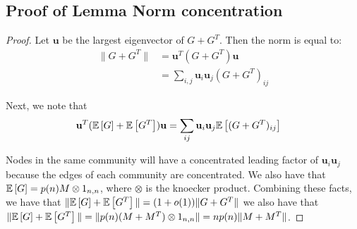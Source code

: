 \subsection{Proof of Lemma Norm concentration}
\begin{proof}\label{lem:norm_eq}
    Let $\mathbf{u}$ be the largest eigenvector of $G+G^T$. Then the norm is equal to:
    \begin{align*}
        \| G +G^T \| &= \mathbf{u}^T (G+G^T) \mathbf{u} \\
        &= \sum_{i,j} \mathbf{u}_i \mathbf{u}_j (G+G^T)_{ij}
    \end{align*}

  Next, we note that
  \begin{align*}
      \mathbf{u}^T (\mathbb{E}\left[G\right] + \mathbb{E}\left[G^T\right]) \mathbf{u} &= \sum_{ij}\mathbf{u}_i \mathbf{u}_j \mathbb{E}\left[(G+G^T)_{ij}  \right] 
  \end{align*}

 Nodes in the same community will have a concentrated leading factor of $\mathbf{u}_i \mathbf{u}_j$ because the edges of each community are concentrated. We also have that $\mathbb{E}\left[G\right] = p(n) M \otimes 1_{n,n}$, where $\otimes$ is the knoecker product.  Combining these facts, we have that  $\|\mathbb{E}\left[G\right]  + \mathbb{E}\left[G^T\right]\| = (1 + o(1)) \| G+G^T \| $ we also have that $\|\mathbb{E}\left[G\right]  + \mathbb{E}\left[G^T\right]\| = \| p(n) (M+M^T) \otimes 1_{n,n} \| = n p(n) \| M+M^T \| $. 
\end{proof}


